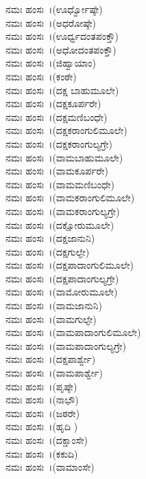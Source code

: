  ನಮಃ ಹಂಸಃ~।(ಊರ್ಧ್ವೋಷ್ಠೇ)\\
 ನಮಃ ಹಂಸಃ~।(ಅಧರೋಷ್ಠೇ)\\
 ನಮಃ ಹಂಸಃ~।(ಊರ್ಧ್ವದಂತಪಂಕ್ತೌ)\\
 ನಮಃ ಹಂಸಃ~।(ಅಧೋದಂತಪಂಕ್ತೌ)\\
 ನಮಃ ಹಂಸಃ~।(ಜಿಹ್ವಾಯಾಂ)\\
 ನಮಃ ಹಂಸಃ~।(ಕಂಠೇ)\\
 ನಮಃ ಹಂಸಃ~।(ದಕ್ಷ ಬಾಹುಮೂಲೇ)\\
 ನಮಃ ಹಂಸಃ~।(ದಕ್ಷಕೂರ್ಪರೇ)\\
 ನಮಃ ಹಂಸಃ~।(ದಕ್ಷಮಣಿಬಂಧೇ)\\
 ನಮಃ ಹಂಸಃ~।(ದಕ್ಷಕರಾಂಗುಲಿಮೂಲೇ)\\
 ನಮಃ ಹಂಸಃ~।(ದಕ್ಷಕರಾಂಗುಲ್ಯಗ್ರೇ)\\
 ನಮಃ ಹಂಸಃ~।(ವಾಮಬಾಹುಮೂಲೇ)\\
 ನಮಃ ಹಂಸಃ~।(ವಾಮಕೂರ್ಪರೇ)\\
 ನಮಃ ಹಂಸಃ~।(ವಾಮಮಣಿಬಂಧೇ)\\
 ನಮಃ ಹಂಸಃ~।(ವಾಮಕರಾಂಗುಲಿಮೂಲೇ)\\
 ನಮಃ ಹಂಸಃ~।(ವಾಮಕರಾಂಗುಲ್ಯಗ್ರೇ)\\
 ನಮಃ ಹಂಸಃ~।(ದಕ್ಷೋರುಮೂಲೇ)\\
 ನಮಃ ಹಂಸಃ~।(ದಕ್ಷಜಾನುನಿ)\\
 ನಮಃ ಹಂಸಃ~।(ದಕ್ಷಗುಲ್ಫೇ)\\
 ನಮಃ ಹಂಸಃ~।(ದಕ್ಷಪಾದಾಂಗುಲಿಮೂಲೇ)\\
 ನಮಃ ಹಂಸಃ~।(ದಕ್ಷಪಾದಾಂಗುಲ್ಯಗ್ರೇ)\\
 ನಮಃ ಹಂಸಃ~।(ವಾಮೋರುಮೂಲೇ)\\
 ನಮಃ ಹಂಸಃ~।(ವಾಮಜಾನುನಿ)\\
 ನಮಃ ಹಂಸಃ~।(ವಾಮಗುಲ್ಫೇ)\\
 ನಮಃ ಹಂಸಃ~।(ವಾಮಪಾದಾಂಗುಲಿಮೂಲೇ)\\
 ನಮಃ ಹಂಸಃ~।(ವಾಮಪಾದಾಂಗುಲ್ಯಗ್ರೇ)\\
 ನಮಃ ಹಂಸಃ~।(ದಕ್ಷಪಾರ್ಶ್ವೇ)\\
 ನಮಃ ಹಂಸಃ~।(ವಾಮಪಾರ್ಶ್ವೇ)\\
 ನಮಃ ಹಂಸಃ~।(ಪೃಷ್ಠೇ)\\
 ನಮಃ ಹಂಸಃ~।(ನಾಭೌ)\\
 ನಮಃ ಹಂಸಃ~।(ಜಠರೇ)\\
 ನಮಃ ಹಂಸಃ~।(ಹೃದಿ )\\
 ನಮಃ ಹಂಸಃ~।(ದಕ್ಷಾಂಸೇ)\\
 ನಮಃ ಹಂಸಃ~।(ಕಕುದಿ)\\
 ನಮಃ ಹಂಸಃ~।(ವಾಮಾಂಸೇ)\\

